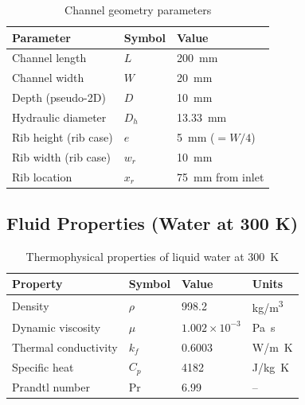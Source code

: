 \documentclass[12pt, a4paper]{article}
\begin{document}
\begin{table}[H]
    \centering
    \caption{Channel geometry parameters}
    \begin{tabular}{lll}
        \toprule
        Parameter & Symbol & Value \\
        \midrule
        Channel length & $L$ & \SI{200}{mm} \\
        Channel width  & $W$ & \SI{20}{mm} \\
        Depth (pseudo-2D) & $D$ & \SI{10}{mm} \\
        Hydraulic diameter & $D_h$ & \SI{13.33}{mm} \\
        Rib height (rib case) & $e$ & \SI{5}{mm} ($= W/4$) \\
        Rib width (rib case) & $w_r$ & \SI{10}{mm} \\
        Rib location & $x_r$ & \SI{75}{mm} from inlet \\
        \bottomrule
    \end{tabular}
\end{table}

\subsection{Fluid Properties (Water at 300 K)}
\begin{table}[H]
    \centering
    \caption{Thermophysical properties of liquid water at \SI{300}{K}}
    \begin{tabular}{llll}
        \toprule
        Property & Symbol & Value & Units \\
        \midrule
        Density & $\rho$ & 998.2 & \si{kg/m^3} \\
        Dynamic viscosity & $\mu$ & $1.002 \times 10^{-3}$ & \si{Pa.s} \\
        Thermal conductivity & $k_f$ & 0.6003 & \si{W/m.K} \\
        Specific heat & $C_p$ & 4182 & \si{J/kg.K} \\
        Prandtl number & Pr & 6.99 & -- \\
        \bottomrule
    \end{tabular}
\end{table}
\end{document}

